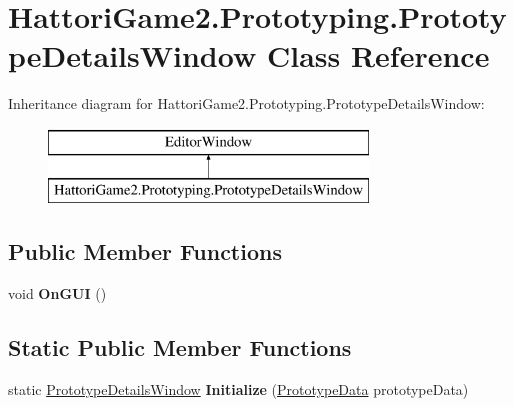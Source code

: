 \hypertarget{class_hattori_game2_1_1_prototyping_1_1_prototype_details_window}{}\section{Hattori\+Game2.\+Prototyping.\+Prototype\+Details\+Window Class Reference}
\label{class_hattori_game2_1_1_prototyping_1_1_prototype_details_window}
Inheritance diagram for Hattori\+Game2.\+Prototyping.\+Prototype\+Details\+Window\+:\begin{figure}[H]
\begin{center}
\leavevmode
\includegraphics[height=2.000000cm]{class_hattori_game2_1_1_prototyping_1_1_prototype_details_window}
\end{center}
\end{figure}
\subsection*{Public Member Functions}
\begin{DoxyCompactItemize}
\item 
\hypertarget{class_hattori_game2_1_1_prototyping_1_1_prototype_details_window_a7cbbeeacbb565936768216818483e850}{}void {\bfseries On\+G\+U\+I} ()\label{class_hattori_game2_1_1_prototyping_1_1_prototype_details_window_a7cbbeeacbb565936768216818483e850}

\end{DoxyCompactItemize}
\subsection*{Static Public Member Functions}
\begin{DoxyCompactItemize}
\item 
\hypertarget{class_hattori_game2_1_1_prototyping_1_1_prototype_details_window_a1d4899b3ac83a1e7a90a8449d36a2566}{}static \hyperlink{class_hattori_game2_1_1_prototyping_1_1_prototype_details_window}{Prototype\+Details\+Window} {\bfseries Initialize} (\hyperlink{class_hattori_game2_1_1_prototyping_1_1_prototype_data}{Prototype\+Data} prototype\+Data)\label{class_hattori_game2_1_1_prototyping_1_1_prototype_details_window_a1d4899b3ac83a1e7a90a8449d36a2566}

\end{DoxyCompactItemize}

